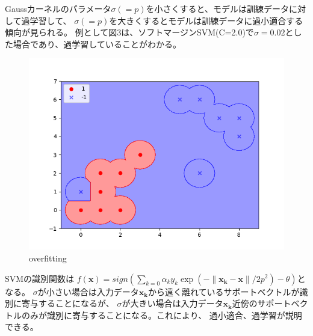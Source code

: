 \documentclass{jsarticle}
\begin{document}
Gaussカーネルのパラメータ$\sigma(= p)$を小さくすると、モデルは訓練データに対して過学習して、
$\sigma(= p)$を大きくするとモデルは訓練データに過小適合する傾向が見られる。
例として図3は、ソフトマージンSVM(C=2.0)で$\sigma=0.02$とした場合であり、過学習していることがわかる。
\begin{figure}[!h]
\centering \includegraphics[width=15cm]{overfitting.png}
\caption{overfitting}
\end{figure}
SVMの識別関数は
$f(\bm{x}) = sign(\sum_{k=0} \alpha_k y_k \exp(-\|\bm{x_k}-\bm{x}\| / 2p^2) - \theta)$となる。
$\sigma$が小さい場合は入力データ$\bm{x_k}$から遠く離れているサポートベクトルが識別に寄与することになるが、
$\sigma$が大きい場合は入力データ$\bm{x_k}$近傍のサポートベクトルのみが識別に寄与することになる。これにより、
過小適合、過学習が説明できる。
\end{document}
